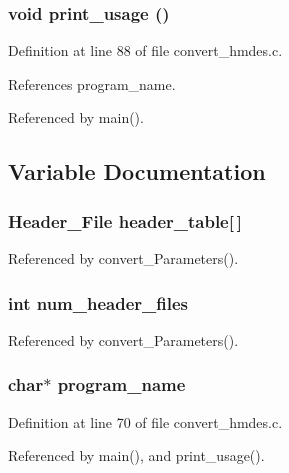 \subsubsection{\setlength{\rightskip}{0pt plus 5cm}void print\_\-usage ()}\label{convert__hmdes_8c_e5ad5cbeccaedc03a48d3c7eaa803e79}




Definition at line 88 of file convert\_\-hmdes.c.

References program\_\-name.

Referenced by main().

\subsection{Variable Documentation}
\subsubsection{\setlength{\rightskip}{0pt plus 5cm}\bf{Header\_\-File} \bf{header\_\-table}[$\,$]}\label{convert__hmdes_8c_44407bf7029d07dd2cdec64d45500e7a}




Referenced by convert\_\-Parameters().
\subsubsection{\setlength{\rightskip}{0pt plus 5cm}int \bf{num\_\-header\_\-files}}\label{convert__hmdes_8c_1771c66351c3c7fd849af851b3e31455}




Referenced by convert\_\-Parameters().
\subsubsection{\setlength{\rightskip}{0pt plus 5cm}char$\ast$ \bf{program\_\-name}}\label{convert__hmdes_8c_289c5900d90626d909f0a85d5a0ed61d}




Definition at line 70 of file convert\_\-hmdes.c.

Referenced by main(), and print\_\-usage().